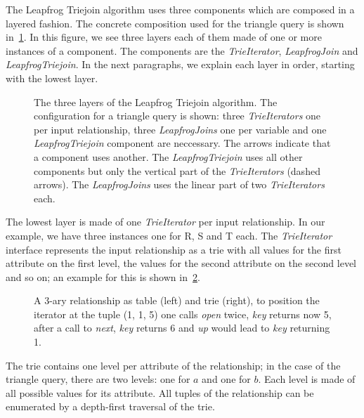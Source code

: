 The Leapfrog Triejoin algorithm uses three components which are composed in a layered fashion.
The concrete composition used for the triangle query is shown in~\cref{fig:lftj-layers}.
In this figure, we see three layers each of them made of one or more instances of a component.
The components are the \textit{TrieIterator}, \textit{LeapfrogJoin} and \textit{LeapfrogTriejoin}.
In the next paragraphs, we explain each layer in order, starting with the lowest layer.

\begin{figure}
    
    \caption{
    The three layers of the Leapfrog Triejoin algorithm.
    The configuration for a triangle query is shown: three \textit{TrieIterators} one
    per input relationship, three \textit{LeapfrogJoins} one per variable and
    one \textit{LeapfrogTriejoin} component are neccessary.
    The arrows indicate that a component uses another.
    The \textit{LeapfrogTriejoin} uses all other components but only the vertical part of the \textit{TrieIterators} (dashed arrows).
    The \textit{LeapfrogJoins} uses the linear part of two \textit{TrieIterators} each.
    }
    \label{fig:lftj-layers}
\end{figure}

The lowest layer is made of one \textit{TrieIterator} per input relationship.
In our example, we have three instances one for R, S and T each.
The \textit{TrieIterator} interface represents the input relationship as a trie with all values for
the first attribute on the first level, the values for the second attribute on the second level and so
on; an example for this is shown in~\cref{fig:trie-example}.

\begin{figure}
    \centering
    
    \caption{A 3-ary relationship as table (left) and trie (right), to position the iterator at the tuple (1, 1, 5) one
    calls \textit{open} twice, \textit{key} returns now 5, after a call to \textit{next}, \textit{key} returns 6 and \textit{up}
    would lead to \textit{key} returning 1.}
    \label{fig:trie-example}
\end{figure}

The trie contains one level per attribute of the relationship;
in the case of the triangle query, there are two levels: one for $a$ and one for $b$.
Each level is made of all possible values for its attribute.
All tuples of the relationship can be enumerated by a depth-first traversal of the trie.

